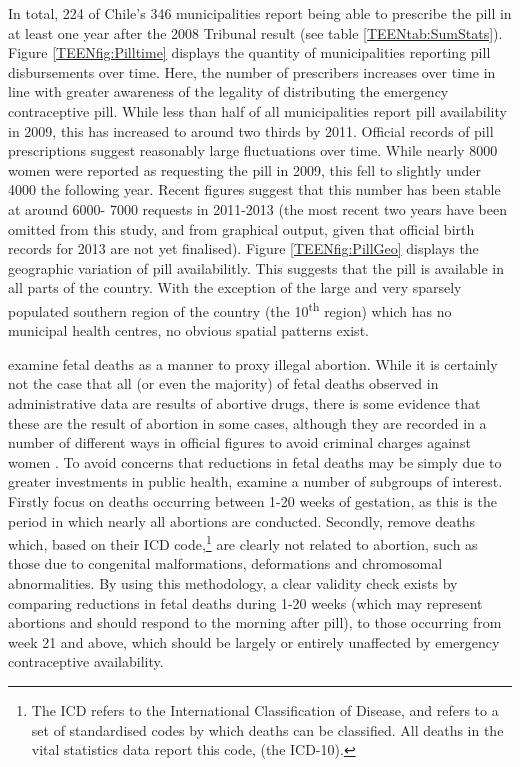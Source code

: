 In total, 224 of Chile's 346 municipalities report being able to prescribe the 
pill in at least one year after the 2008 Tribunal result (see table 
\ref{TEENtab:SumStats}). Figure \ref{TEENfig:Pilltime} displays the quantity
of municipalities reporting pill disbursements over time.  Here, the number
of prescribers increases over time in line with greater awareness of the legality 
of distributing the emergency contraceptive pill.  While less than half of all
municipalities report pill availability in 2009, this has increased to around
two thirds by 2011.  Official records of pill prescriptions suggest reasonably
large fluctuations over time.  While nearly 8000 women were reported as 
requesting the pill in 2009, this fell to slightly under 4000 the following
year.  Recent figures suggest that this number has been stable at around 6000-%
7000 requests in 2011-2013 (the most recent two years have been omitted from
this study, and from graphical output, given that official birth records for
2013 are not yet finalised).  Figure \ref{TEENfig:PillGeo} displays
the geographic variation of pill availabilitly.  This suggests that the pill
is available in all parts of the country. With the exception of the large and 
very sparsely populated southern region of the country (the 
10\textsuperscript{th} region) which has no municipal health centres, no 
obvious spatial patterns exist.

\Person examine fetal deaths as a manner to proxy illegal abortion.  While it 
is certainly not the case that all (or even the majority) of fetal deaths 
observed in administrative data are results of abortive drugs, there is some
evidence that these are the result of abortion in some cases, although they are 
recorded in a number of different ways in official figures to avoid criminal 
charges against women \citep{ShepardCasas2007}.  To avoid concerns that 
reductions in fetal deaths may be simply due to greater investments in public
health, \person examine a number of subgroups of interest.  Firstly \person focus 
on deaths occurring between 1-20 weeks of gestation, as this is the period in 
which nearly all abortions are conducted.  Secondly, \person remove deaths which,
based on their ICD code,\footnote{The ICD refers to the International 
Classification of Disease, and refers to a set of standardised codes by which
deaths can be classified.  All deaths in the vital statistics data report this 
code, (the ICD-10).} are clearly not related to abortion, such as those due to 
congenital malformations, deformations and chromosomal abnormalities.  By
using this methodology, a clear validity check exists by comparing reductions
in fetal deaths during 1-20 weeks (which may represent abortions and should
respond to the morning after pill), to those occurring from week 21 and above,
which should be largely or entirely unaffected by emergency contraceptive
availability.

